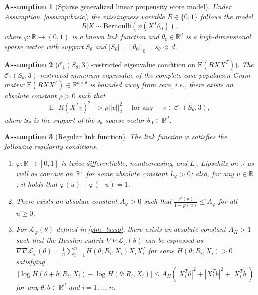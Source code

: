 \documentclass[ejsv2,noshowframe]{imsart}
\theoremstyle{plain}
\newtheorem{assumption}{Assumption}
\theoremstyle{definition}
\theoremstyle{remark}
\newcommand{\norm}[1]{\left|\left| #1 \right|\right|}
\begin{document}
\begin{assumption}[Sparse generalized linear propensity score model]
	\label{assump:glm_prop_score}
	Under Assumption~\ref{assump:basic}, the missingness variable $R\in \{0,1\}$ follows the model
	\begin{equation}
		\label{prop_score_model}
		R|X \sim \mathrm{Bernoulli}\left(\varphi(X^T \theta_0) \right),
	\end{equation}
	where $\varphi: \mathbb{R} \to (0,1)$ is a known link function and $\theta_0\in \mathbb{R}^d$ is a high-dimensional sparse vector with support $S_{\theta}$ and $|S_{\theta}|=\norm{\theta_0}_0=s_{\theta} \ll d$. 
\end{assumption}

\begin{assumption}[$\mathcal{C}_1(S_{\theta},3)$-restricted eigenvalue condition on $\mathrm{E}(RXX^T)$]
	\label{assump:res_eigen_theta}
	The $\mathcal{C}_1(S_{\theta},3)$-restricted minimum eigenvalue of the complete-case population Gram matrix $\mathrm{E}\left(RXX^T \right) \in \mathbb{R}^{d\times d}$ is bounded away from zero, \emph{i.e.}, there exists an absolute constant $\rho>0$ such that
	$$\mathrm{E}\left[R(X^Tv)^2\right] > \rho \norm{v}_2^2 \quad \text{ for any } \quad v\in \mathcal{C}_1(S_{\theta},3),$$
	where $S_{\theta}$ is the support of the $s_{\theta}$-sparse vector $\theta_0 \in \mathbb{R}^d$.
\end{assumption}

\begin{assumption}[Regular link function]
	\label{assump:link_func}
	The link function $\varphi$ satisfies the following regularity conditions.
	\begin{enumerate}[label=(\alph*)]
		\item $\varphi:\mathbb{R} \to [0,1]$ is twice differentiable, nondecreasing, and $L_{\varphi}$-Lipschitz on $\mathbb{R}$ as well as concave on $\mathbb{R}^+$ for some absolute constant $L_{\varphi}>0$; also, for any $u\in \mathbb{R}$, it holds that $\varphi(u)+\varphi(-u)=1$.
		\item There exists an absolute constant $A_{\varphi}>0$ such that $\frac{\varphi'(u)}{1-\varphi(u)} \leq A_{\varphi}$ for all $u\geq 0$.
		
		\item For $\mathcal{L}_{\varphi}(\theta)$ defined in \eqref{glm_lasso}, there exists an absolute constant $A_H>1$ such that the Hessian matrix $\nabla\nabla \mathcal{L}_{\varphi}(\theta)$ can be expressed as $\nabla\nabla \mathcal{L}_{\varphi}(\theta) = \frac{1}{n} \sum_{i=1}^n H(\theta; R_i,X_i) X_iX_i^T$
		for some $H(\theta;R_i,X_i) > 0$ satisfying 
		$$\left|\log H(\theta + b; R_i,X_i) -\log H(\theta;R_i,X_i) \right| \leq A_H\left(|X_i^T\theta|^2 + |X_i^T b|^2 + |X_i^T b| \right)$$ 
		for any $\theta, b\in \mathbb{R}^d$ and $i=1,...,n$.
	\end{enumerate}
\end{assumption}
\end{document}
